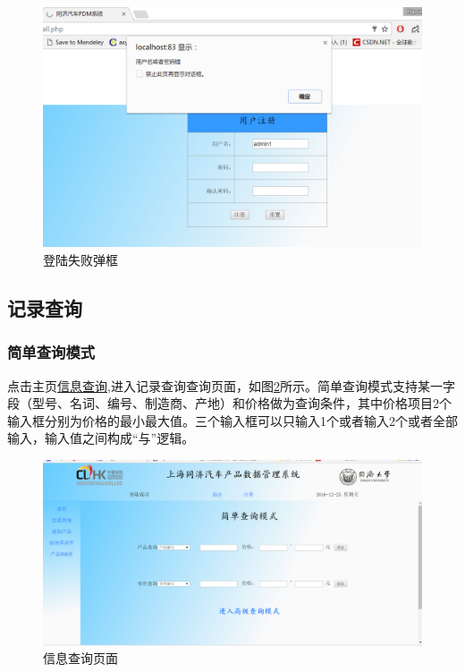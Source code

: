 \begin{figure}[H]
\centering
\includegraphics[width=0.9\linewidth]{figure/loslogin}
\caption{登陆失败弹框}
\label{fig:loslogin}
\end{figure}



\subsection{记录查询}

\subsubsection{简单查询模式}
点击主页\underline{信息查询},进入记录查询查询页面，如图\ref{fig:simplesearch}所示。简单查询模式支持某一字段（型号、名词、编号、制造商、产地）和价格做为查询条件，其中价格项目2个输入框分别为价格的最小最大值。三个输入框可以只输入1个或者输入2个或者全部输入，输入值之间构成``与''逻辑。
\begin{figure}[H]
\centering
\includegraphics[width=0.8\linewidth]{figure/simplesearch}
\caption{信息查询页面}
\label{fig:simplesearch}
\end{figure}

